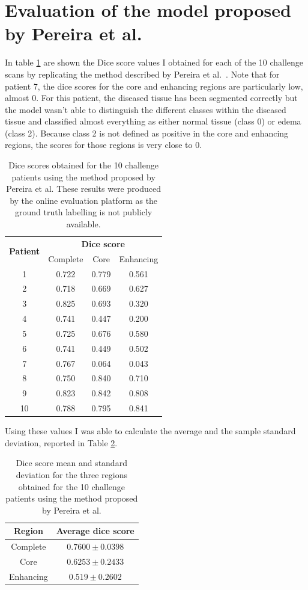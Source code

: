 \documentclass[12pt,a4paper,twoside,openright]{report}
\begin{document}
\section{Evaluation of the model proposed by Pereira et al.}
In table \ref{table:pereira_dice_results} are shown the Dice score values I obtained for each of the 10 challenge scans by replicating the method described by Pereira et al.\ \cite{pereira}. Note that for patient 7, the dice scores for the core and enhancing regions are particularly low, almost 0. For this patient, the diseased tissue has been segmented correctly but the model wasn't able to distinguish the different classes within the diseased tissue and classified almost everything as either normal tissue (class 0) or edema (class 2). Because class 2 is not defined as positive in the core and enhancing regions, the scores for those regions is very close to 0.
\begin{table}[h]
\centering	
\label{table:pereira_dice_results}
\begin{tabular}{ c | c c c} 
\multirow{2}{*}{\textbf{Patient}} & \multicolumn{3}{c}{\textbf{Dice score}} \\
 & Complete & Core & Enhancing \\
 \hline
1 &	0.722 & 0.779 & 0.561\\
2 & 0.718 & 0.669 & 0.627 \\
3 & 0.825 & 0.693 & 0.320 \\
4 & 0.741 & 0.447 & 0.200 \\
5 & 0.725 & 0.676 & 0.580 \\
6 & 0.741 & 0.449 & 0.502 \\
7 & 0.767 & 0.064 & 0.043 \\
8 & 0.750 & 0.840 & 0.710 \\
9 & 0.823 & 0.842 & 0.808 \\
10 & 0.788 & 0.795 & 0.841 \\
\end{tabular}
\caption{Dice scores obtained for the 10 challenge patients using the method proposed by Pereira et al. These results were produced by the online evaluation platform as the ground truth labelling is not publicly available.}
\end{table}

Using these values I was able to calculate the average and the sample standard deviation, reported in Table \ref{table:pereira_dice_average}.
\begin{table}[h]
\centering	
\label{table:pereira_dice_average}
\begin{tabular}{ c | c } 
\textbf{Region} & \textbf{Average dice score}\\
 \hline
Complete &	$0.7600 \pm 0.0398$ \\
Core & 		$0.6253 \pm 0.2433$ \\
Enhancing & $0.519  \pm 0.2602$ \\
\end{tabular}
\caption{Dice score mean and standard deviation for the three regions obtained for the 10 challenge patients using the method proposed by Pereira et al.}
\end{table}
\end{document}
